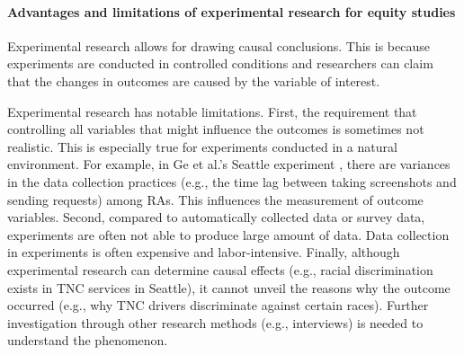 \documentclass[11pt]{article}
\begin{document}
\paragraph{Advantages and limitations of experimental research for equity studies}
Experimental research allows for drawing causal conclusions. This is because experiments are conducted in controlled conditions and researchers can claim that the changes in outcomes are caused by the variable of interest. 

Experimental research has notable limitations. First, the requirement that controlling all variables that might influence the outcomes is sometimes not realistic. This is especially true for experiments conducted in a natural environment. For example, in Ge et al.’s Seattle experiment \cite{ge2016racial}, there are variances in the data collection practices (e.g., the time lag between taking screenshots and sending requests) among RAs. This influences the measurement of outcome variables. Second, compared to automatically collected data or survey data, experiments are often not able to produce large amount of data. Data collection in experiments is often expensive and labor-intensive. Finally, although experimental research can determine causal effects (e.g., racial discrimination exists in TNC services in Seattle), it cannot unveil the reasons why the outcome occurred (e.g., why TNC drivers discriminate against certain races). Further investigation through other research methods (e.g., interviews) is needed to understand the phenomenon.  
\end{document}

